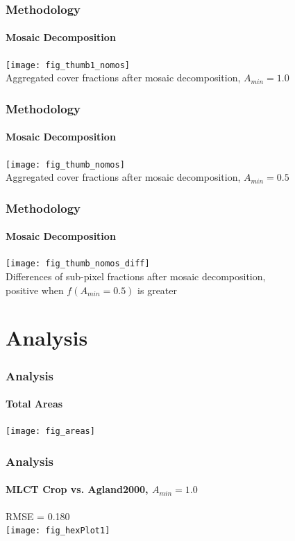\documentclass{beamer}
\begin{document}
\begin{frame}
  \frametitle{Methodology}
  \framesubtitle{Mosaic Decomposition}
  \begin{center}
    \texttt{[image: fig\_thumb1\_nomos]} \\
    {\tiny Aggregated cover fractions after mosaic decomposition, $A_{min}=1.0$}
  \end{center}
\end{frame}

\begin{frame}
  \frametitle{Methodology}
  \framesubtitle{Mosaic Decomposition}
  \begin{center}
    \texttt{[image: fig\_thumb\_nomos]} \\
    {\tiny Aggregated cover fractions after mosaic decomposition,
      $A_{min}=0.5$}
  \end{center}
\end{frame}

\begin{frame}
  \frametitle{Methodology}
  \framesubtitle{Mosaic Decomposition}
  \begin{center}
    \texttt{[image: fig\_thumb\_nomos\_diff]} \\
    {\tiny Differences of sub-pixel fractions after mosaic
      decomposition, \\
      positive when $f(A_{min} = 0.5)$ is greater}
  \end{center}
\end{frame}



\section{Analysis}
\label{sec:analysis}

\begin{frame}
  \frametitle{Analysis}
  \framesubtitle{Total Areas}
  \begin{center}
    \texttt{[image: fig\_areas]}    
  \end{center}
\end{frame}

\begin{frame}[label=hexPlot1]
  \frametitle{Analysis}
  \framesubtitle{MLCT Crop vs. Agland2000, $A_{min}=1.0$}
  \begin{center}
    RMSE = 0.180 \\
    \texttt{[image: fig\_hexPlot1]}    
  \end{center}
\end{frame}
\end{document}
